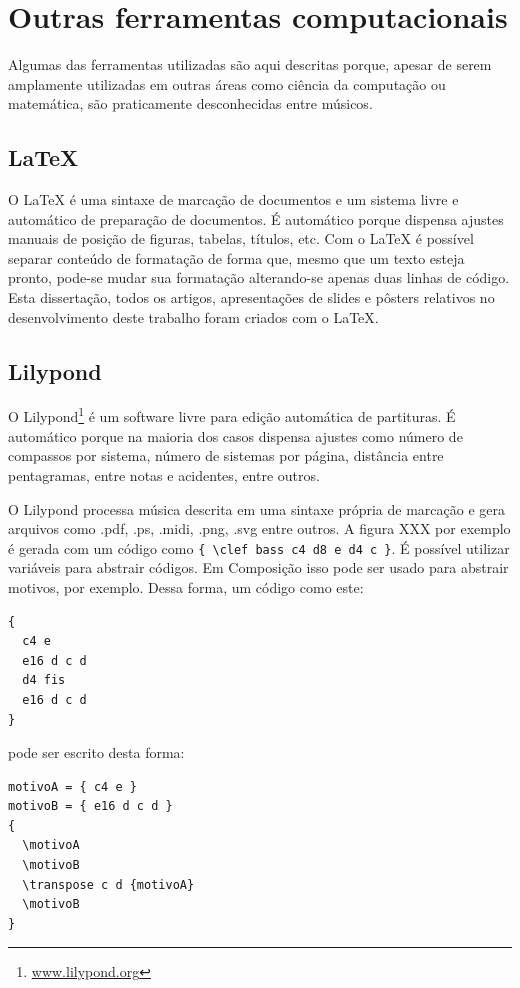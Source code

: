 \section{Outras ferramentas computacionais}
\label{sec:outr-ferr-comp}

Algumas das ferramentas utilizadas são aqui descritas porque, apesar
de serem amplamente utilizadas em outras áreas como ciência da
computação ou matemática, são praticamente desconhecidas entre
músicos.

\subsection{\LaTeX{}}
\label{sec:latex}

O \LaTeX{} é uma sintaxe de marcação de documentos e um sistema livre
e automático de preparação de documentos. É automático porque dispensa
ajustes manuais de posição de figuras, tabelas, títulos, etc. Com o
\LaTeX{} é possível separar conteúdo de formatação de forma que, mesmo
que um texto esteja pronto, pode-se mudar sua formatação alterando-se
apenas duas linhas de código. Esta dissertação, todos os artigos,
apresentações de slides e pôsters relativos no desenvolvimento deste
trabalho foram criados com o \LaTeX{}.

\subsection{Lilypond}
\label{sec:lilypond}

O Lilypond\footnote{\url{www.lilypond.org}} é um software livre para
edição automática de partituras. É automático porque na maioria dos
casos dispensa ajustes como número de compassos por sistema, número de
sistemas por página, distância entre pentagramas, entre notas e
acidentes, entre outros.

O Lilypond processa música descrita em uma sintaxe própria de marcação
e gera arquivos como .pdf, .ps, .midi, .png, .svg entre outros. A
figura XXX por exemplo é gerada com um código como
\verb!{ \clef bass c4 d8 e d4 c }!. É possível utilizar variáveis para
abstrair códigos. Em Composição isso pode ser usado para abstrair
motivos, por exemplo. Dessa forma, um código como este:

\begin{verbatim}
{
  c4 e
  e16 d c d
  d4 fis
  e16 d c d
}
\end{verbatim}

pode ser escrito desta forma:

\begin{verbatim}
motivoA = { c4 e }
motivoB = { e16 d c d }
{
  \motivoA
  \motivoB
  \transpose c d {motivoA}
  \motivoB
}
\end{verbatim}

